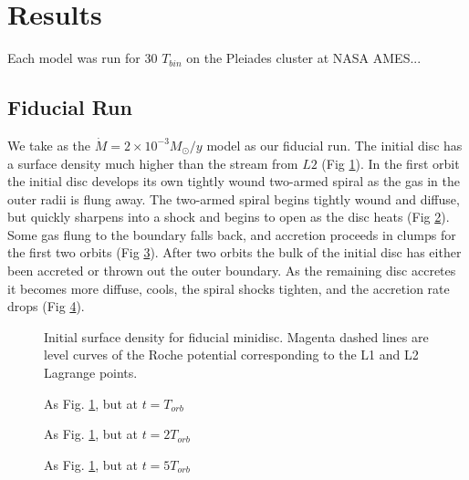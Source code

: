 \documentclass{emulateapj}
\begin{document}


\section{Results}
\label{sec:results}

Each model was run for 30 $T_{bin}$ on the Pleiades cluster at NASA AMES...

\subsection{Fiducial Run}
\label{subsec:fiducial}

We take as the $\dot{M} = 2 \times 10^{-3} M_\odot / y$ model as our fiducial run.  The initial disc has a surface density much higher than the stream from $L2$ (Fig \ref{fi:sig-fid-0}).  In the first orbit the initial disc develops its own tightly wound two-armed spiral as the gas in the outer radii is flung away.  The two-armed spiral begins tightly wound and diffuse, but quickly sharpens into a shock and begins to open as the disc heats (Fig \ref{fi:sig-fid-1}).  Some gas flung to the boundary falls back, and accretion proceeds in clumps for the first two orbits (Fig \ref{fi:sig-fid-2}).  After two orbits the bulk of the initial disc has either been accreted or thrown out the outer boundary.  As the remaining disc accretes it becomes more diffuse, cools, the spiral shocks tighten, and the accretion rate drops (Fig \ref{fi:sig-fid-5}).

\begin{figure}
\caption{\label{fi:sig-fid-0} Initial surface density for fiducial minidisc.  Magenta dashed lines are level curves of the Roche potential corresponding to the L1 and L2 Lagrange points.}
\end{figure}

\begin{figure}
\caption{\label{fi:sig-fid-1} As Fig. \ref{fi:sig-fid-0}, but at $t = T_{orb}$}
\end{figure}

\begin{figure}
\caption{\label{fi:sig-fid-2} As Fig. \ref{fi:sig-fid-0}, but at $t = 2 T_{orb}$}
\end{figure}

\begin{figure}
\caption{\label{fi:sig-fid-5} As Fig. \ref{fi:sig-fid-0}, but at $t = 5 T_{orb}$}
\end{figure}
\end{document}
